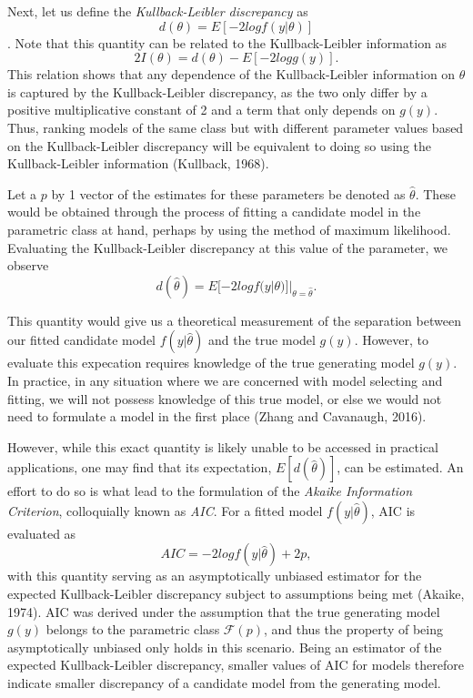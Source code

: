 		Next, let us define the \textit{Kullback-Leibler discrepancy} as
		\begin{equation}
			d(\theta) = E[-2 log f(y|\theta)]
		\end{equation}.
		Note that this quantity can be related to the Kullback-Leibler information as
		\begin{equation}
			2 I(\theta) = d(\theta) - E \left[ -2 log g(y) \right].
		\end{equation}
		This relation shows that any dependence of the Kullback-Leibler information on $\theta$ is captured by the Kullback-Leibler discrepancy, as the two only differ by a positive
		multiplicative constant of 2 and a term that only depends on $g(y)$. Thus, ranking models of the same class but with different parameter values based on the Kullback-Leibler
		discrepancy will be equivalent to doing so using the Kullback-Leibler information (Kullback, 1968).
		
		Let a $p$ by 1 vector of the estimates for these parameters be denoted as $\hat{\theta}$. These would be obtained through the process of fitting a candidate model in the
		parametric class at hand, perhaps by using the method of maximum likelihood. Evaluating the Kullback-Leibler discrepancy at this value of the parameter, we observe
		\begin{equation}
			d(\hat{\theta}) = E [ -2 log f(y | \theta)]|_{\theta = \hat{\theta}}.
		\end{equation}

		This quantity would give us a theoretical measurement of the separation between our fitted candidate model $f(y|\hat{\theta})$ and the true model $g(y)$. However, to
		evaluate this expecation requires knowledge of the true generating model $g(y)$. In practice, in any situation where we are concerned with model selecting and fitting,
		we will not possess knowledge of this true model, or else we would not need to formulate a model in the first place (Zhang and Cavanaugh, 2016).

		However, while this exact quantity is likely unable to be accessed in practical applications, one may find that its expectation, $E[d(\hat{\theta})]$, can be estimated. An
		effort to do so is what lead to the formulation of the \textit{Akaike Information Criterion}, colloquially known as \textit{AIC}. For a fitted model $f(y|\hat{\theta})$,
		AIC is evaluated as
		\begin{equation}
			AIC = -2 log f(y|\hat{\theta}) + 2 p,
		\end{equation}
		with this quantity serving as an asymptotically unbiased estimator for the expected Kullback-Leibler discrepancy subject to assumptions being met (Akaike, 1974). AIC was derived
		under the assumption that the true generating model $g(y)$ belongs to the parametric class $\mathcal{F}(p)$, and thus the property of being asymptotically unbiased only
		holds in this scenario. Being an estimator of the expected Kullback-Leibler discrepancy, smaller values of AIC for models therefore indicate smaller discrepancy of a candidate
		model from the generating model.  

